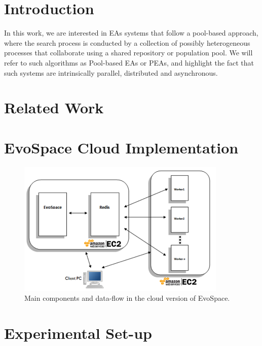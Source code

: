 \documentclass{llncs}
\begin{document}
\section{Introduction}
In this work, we are interested in EAs systems that follow a
pool-based approach, where the search process is conducted by a
collection of possibly heterogeneous processes that collaborate using
a shared repository or population pool. We will refer to such
algorithms as Pool-based EAs or PEAs, and highlight the fact that such
systems are intrinsically parallel, distributed and asynchronous. 


\section{Related Work}

\section{EvoSpace Cloud Implementation}
\begin{figure}[t]
    \centering
        \includegraphics[width=10cm]{img/evospace-aws.png}
    \caption{Main components and data-flow in the cloud version of EvoSpace. }
    \label{fig:evospace}
\end{figure}

\section{Experimental Set-up}
\end{document}
